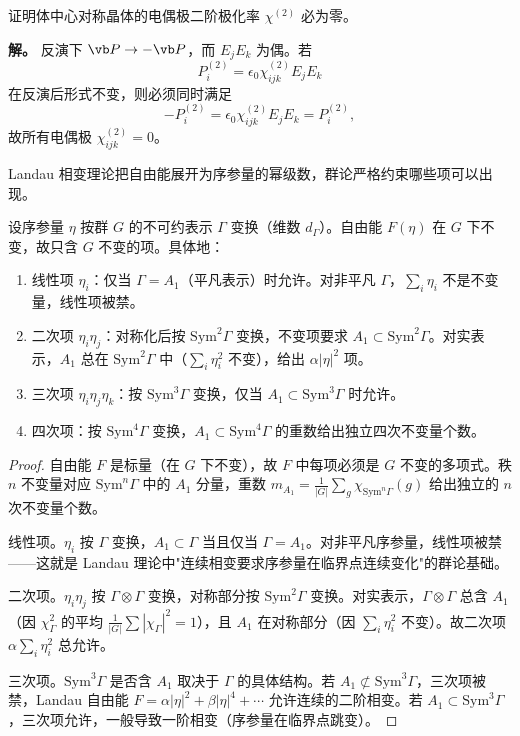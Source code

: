 \begin{workedexample}
证明体中心对称晶体的电偶极二阶极化率 $\chi^{(2)}$ 必为零。

\textbf{解。} 反演下 $\vb P\to-\vb P$，而 $E_jE_k$ 为偶。若
\[
P_i^{(2)}=\epsilon_0\chi^{(2)}_{ijk}E_jE_k
\]
在反演后形式不变，则必须同时满足
\[
-P_i^{(2)}=\epsilon_0\chi^{(2)}_{ijk}E_jE_k=P_i^{(2)},
\]
故所有电偶极 $\chi^{(2)}_{ijk}=0$。
\end{workedexample}



Landau 相变理论把自由能展开为序参量的幂级数，群论严格约束哪些项可以出现。

\begin{theorem}
\label{thm:landau-group}
设序参量 $\eta$ 按群 $G$ 的不可约表示 $\Gamma$ 变换（维数 $d_\Gamma$）。自由能 $F(\eta)$ 在 $G$ 下不变，故只含 $G$ 不变的项。具体地：
\begin{enumerate}[label=(\roman*),leftmargin=3em]
\item 线性项 $\eta_i$：仅当 $\Gamma=A_1$（平凡表示）时允许。对非平凡 $\Gamma$，$\sum_i\eta_i$ 不是不变量，线性项被禁。
\item 二次项 $\eta_i\eta_j$：对称化后按 $\mathrm{Sym}^2\Gamma$ 变换，不变项要求 $A_1\subset\mathrm{Sym}^2\Gamma$。对实表示，$A_1$ 总在 $\mathrm{Sym}^2\Gamma$ 中（$\sum_i\eta_i^2$ 不变），给出 $\alpha|\eta|^2$ 项。
\item 三次项 $\eta_i\eta_j\eta_k$：按 $\mathrm{Sym}^3\Gamma$ 变换，仅当 $A_1\subset\mathrm{Sym}^3\Gamma$ 时允许。
\item 四次项：按 $\mathrm{Sym}^4\Gamma$ 变换，$A_1\subset\mathrm{Sym}^4\Gamma$ 的重数给出独立四次不变量个数。
\end{enumerate}
\end{theorem}

\begin{proof}
自由能 $F$ 是标量（在 $G$ 下不变），故 $F$ 中每项必须是 $G$ 不变的多项式。秩 $n$ 不变量对应 $\mathrm{Sym}^n\Gamma$ 中的 $A_1$ 分量，重数 $m_{A_1}=\frac1{|G|}\sum_g\chi_{\mathrm{Sym}^n\Gamma}(g)$ 给出独立的 $n$ 次不变量个数。

线性项。$\eta_i$ 按 $\Gamma$ 变换，$A_1\subset\Gamma$ 当且仅当 $\Gamma=A_1$。对非平凡序参量，线性项被禁——这就是 Landau 理论中"连续相变要求序参量在临界点连续变化"的群论基础。

二次项。$\eta_i\eta_j$ 按 $\Gamma\otimes\Gamma$ 变换，对称部分按 $\mathrm{Sym}^2\Gamma$ 变换。对实表示，$\Gamma\otimes\Gamma$ 总含 $A_1$（因 $\chi_\Gamma^2$ 的平均 $\frac1{|G|}\sum|\chi_\Gamma|^2=1$），且 $A_1$ 在对称部分（因 $\sum_i\eta_i^2$ 不变）。故二次项 $\alpha\sum_i\eta_i^2$ 总允许。

三次项。$\mathrm{Sym}^3\Gamma$ 是否含 $A_1$ 取决于 $\Gamma$ 的具体结构。若 $A_1\not\subset\mathrm{Sym}^3\Gamma$，三次项被禁，Landau 自由能 $F=\alpha|\eta|^2+\beta|\eta|^4+\cdots$ 允许连续的二阶相变。若 $A_1\subset\mathrm{Sym}^3\Gamma$，三次项允许，一般导致一阶相变（序参量在临界点跳变）。
\end{proof}

